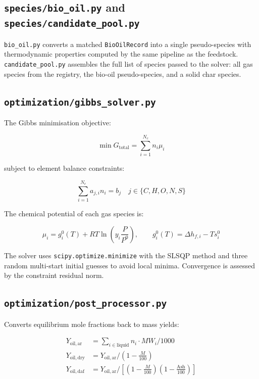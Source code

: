 \documentclass[12pt, a4paper]{article}
\begin{document}
\subsection{\texttt{species/bio\_oil.py} and \texttt{species/candidate\_pool.py}}

\texttt{bio\_oil.py} converts a matched \texttt{BioOilRecord} into a single pseudo-species with thermodynamic properties computed by the same pipeline as the feedstock. \texttt{candidate\_pool.py} assembles the full list of species passed to the solver: all gas species from the registry, the bio-oil pseudo-species, and a solid char species.

\subsection{\texttt{optimization/gibbs\_solver.py}}

The Gibbs minimisation objective:

\begin{equation}
    \min G_{\mathrm{total}} = \sum_{i=1}^{N_c} n_i \mu_i
\end{equation}

subject to element balance constraints:

\begin{equation}
    \sum_{i=1}^{N_c} a_{j,i} n_i = b_j \quad j \in \{C,H,O,N,S\}
\end{equation}

The chemical potential of each gas species is:

\begin{equation}
    \mu_i = g_i^0(T) + RT \ln\!\left(y_i \frac{P}{P^0}\right), \qquad g_i^0(T) = \Delta h_{f,i} - T s_i^0
\end{equation}

The solver uses \texttt{scipy.optimize.minimize} with the SLSQP method and three random multi-start initial guesses to avoid local minima. Convergence is assessed by the constraint residual norm.

\subsection{\texttt{optimization/post\_processor.py}}

Converts equilibrium mole fractions back to mass yields:

\begin{align}
    Y_{\mathrm{oil,ar}} &= \sum_{i \in \mathrm{liquid}} n_i \cdot MW_i / 1000 \\
    Y_{\mathrm{oil,dry}} &= Y_{\mathrm{oil,ar}} \big/ \left(1 - \tfrac{M}{100}\right) \\
    Y_{\mathrm{oil,daf}} &= Y_{\mathrm{oil,ar}} \big/ \left[\left(1 - \tfrac{M}{100}\right)\left(1 - \tfrac{\mathrm{Ash}}{100}\right)\right]
\end{align}
\end{document}
